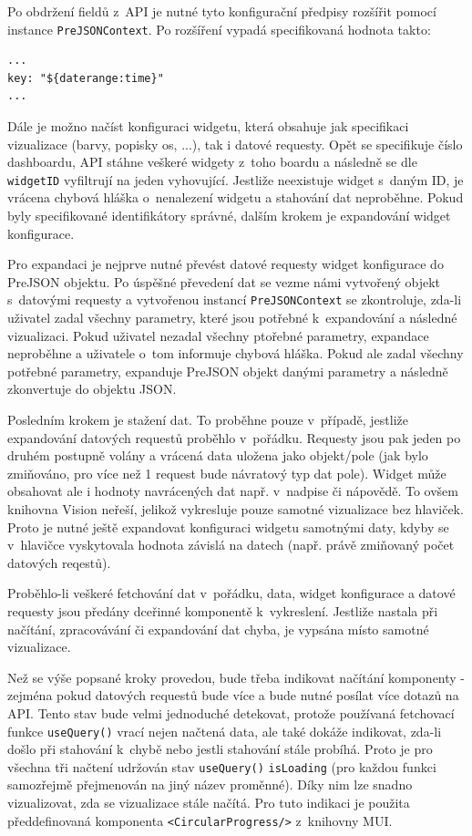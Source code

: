 \documentclass[czech, bc, kiv, he, iso690numb]{fasthesis}
\begin{document}
Po obdržení fieldů z~API je nutné tyto konfigurační předpisy rozšířit pomocí instance \texttt{PreJSONContext}. Po rozšíření vypadá specifikovaná hodnota takto:
\lstset{style=plainsrc}
\begin{lstlisting}
...
key: "${daterange:time}"
...
\end{lstlisting}

Dále je možno načíst konfiguraci widgetu, která obsahuje jak specifikaci vizualizace (barvy, popisky os, ...), tak i datové requesty. Opět se specifikuje číslo dashboardu, API stáhne veškeré widgety z~toho boardu a následně se dle \texttt{widgetID} vyfiltrují na jeden vyhovující. Jestliže
neexistuje widget s~daným ID, je vrácena chybová hláška o~nenalezení widgetu a stahování dat neproběhne. Pokud byly specifikované identifikátory správné, dalším krokem je expandování
widget konfigurace. 

Pro expandaci je nejprve nutné převést datové requesty widget konfigurace do PreJSON objektu. Po úspěšné převedení dat se vezme námi vytvořený objekt s~datovými requesty a vytvořenou instancí \texttt{PreJSONContext} se zkontroluje, zda-li uživatel zadal všechny parametry, které jsou
potřebné k~expandování a následné vizualizaci. Pokud uživatel nezadal všechny ptořebné parametry, expandace neproběhne a uživatele o~tom informuje chybová hláška. Pokud ale zadal 
všechny potřebné parametry, expanduje PreJSON objekt danými parametry a následně zkonvertuje do objektu JSON.

Posledním krokem je stažení dat. To proběhne pouze v~případě, jestliže expandování datových requestů proběhlo v~pořádku. Requesty jsou pak jeden po druhém postupně volány a vrácená data
uložena jako objekt/pole (jak bylo zmiňováno, pro více než 1 request bude návratový typ dat pole). Widget může obsahovat ale i hodnoty navrácených dat např. v~nadpise či nápovědě.
To ovšem knihovna Vision neřeší, jelikož vykresluje pouze samotné vizualizace bez hlaviček. Proto je nutné ještě expandovat konfiguraci widgetu samotnými daty, kdyby se v~hlavičce vyskytovala
hodnota závislá na datech (např. právě zmiňovaný počet datových reqestů). 

Proběhlo-li veškeré fetchování dat v~pořádku, data, widget konfigurace a datové requesty jsou předány dceřinné komponentě k~vykreslení. Jestliže nastala při načítání, zpracovávání či expandování dat
chyba, je vypsána místo samotné vizualizace. 

Než se výše popsané kroky provedou, bude třeba indikovat načítání komponenty - zejména pokud datových requestů bude více a bude nutné posílat více dotazů na API. Tento stav bude velmi jednoduché 
detekovat, protože používaná fetchovací funkce \texttt{useQuery()} vrací nejen načtená data, ale také dokáže indikovat, zda-li došlo při stahování k~chybě nebo jestli stahování stále probíhá. Proto
je pro všechna tři načtení udržován stav \texttt{useQuery()} \texttt{isLoading} (pro každou funkci samozřejmě přejmenován na jiný název proměnné). Díky nim lze snadno vizualizovat, zda se vizualizace stále načítá.
Pro tuto indikaci je použita předdefinovaná komponenta \texttt{<CircularProgress/>} z~knihovny MUI.
\end{document}
